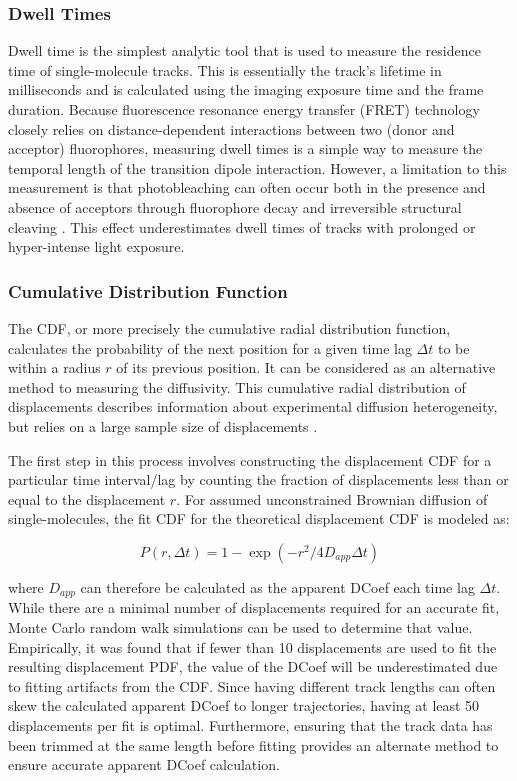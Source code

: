 \documentclass{bioinfo}
\begin{document}
\subsubsection{Dwell Times}

Dwell time is the simplest analytic tool that is used to measure the residence time of single-molecule tracks. This is essentially the track's lifetime in milliseconds and is calculated using the imaging exposure time and the frame duration. Because fluorescence resonance energy transfer (FRET) technology closely relies on distance-dependent interactions between two (donor and acceptor) fluorophores, measuring dwell times is a simple way to measure the temporal length of the transition dipole interaction. However, a limitation to this measurement is that photobleaching can often occur both in the presence and absence of acceptors through fluorophore decay and irreversible structural cleaving \citep{Liu}. This effect underestimates dwell times of tracks with prolonged or hyper-intense light exposure.


\subsubsection{Cumulative Distribution Function}

The CDF, or more precisely the cumulative radial distribution function, calculates the probability of the next position for a given time lag $\Delta t$ to be within a radius $r$ of its previous position. It can be considered as an alternative method to measuring the diffusivity. This cumulative radial distribution of displacements describes information about experimental diffusion heterogeneity, but relies on a large sample size of displacements \citep{Vrljic}.

The first step in this process involves constructing the displacement CDF for a particular time interval/lag by counting the fraction of displacements less than or equal to the displacement $r$. For assumed unconstrained Brownian diffusion of single-molecules, the fit CDF for the theoretical displacement CDF is modeled as:

\begin{equation}
P(r, \Delta t) = 1 - \exp{(-r^2/4D_{app} \Delta t)}\label{eq:11}
\end{equation}

where $D_{app}$ can therefore be calculated as the apparent DCoef each time lag $\Delta t$. While there are a minimal number of displacements required for an accurate fit, Monte Carlo random walk simulations can be used to determine that value. Empirically, it was found that if fewer than 10 displacements are used to fit the resulting displacement PDF, the value of the DCoef will be underestimated due to fitting artifacts from the CDF. Since having different track lengths can often skew the calculated apparent DCoef to longer trajectories, having at least 50 displacements per fit is optimal. Furthermore, ensuring that the track data has been trimmed at the same length before fitting provides an alternate method to ensure accurate apparent DCoef calculation.
\end{document}
